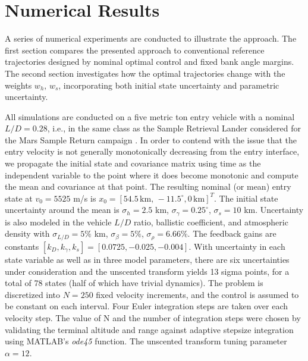 \documentclass[journal ]{new-aiaa}
\begin{document}
\section*{Numerical Results}
A series of numerical experiments are conducted to illustrate the approach. The first section compares the presented approach to conventional reference trajectories designed by nominal optimal control and fixed bank angle margins. The second section investigates how the optimal trajectories change with the weights $w_h,\,w_s$, incorporating both initial state uncertainty and parametric uncertainty.

All simulations are conducted on a five metric ton entry vehicle with a nominal $L/D=0.28$, i.e., in the same class as the Sample Retrieval Lander considered for the Mars Sample Return campaign \cite{MSR}. In order to contend with the issue that the entry velocity is not generally monotonically decreasing from the entry interface, we propagate the initial state and covariance matrix using time as the independent variable to the point where it does become monotonic and compute the mean and covariance at that point. The resulting nominal (or mean) entry state at $v_0 = 5525$ m/s is $x_0 = [54.5\,\mathrm{km},\,-11.5^{\circ}, 0\,\mathrm{km}]^T$. The initial state uncertainty around the mean is $\sigma_h = 2.5$ km, $\sigma_{\gamma} = 0.25^{\circ}$, $\sigma_s = 10$ km. Uncertainty is also modeled in the vehicle $L/D$ ratio, ballistic coefficient, and atmospheric density with $\sigma_{L/D} = 5\%$ km, $\sigma_{\beta} = 5\%$, $\sigma_{\rho} = 6.66\%$. The feedback gains are constants $[k_D, k_{\gamma}, k_s] = [0.0725, -0.025, -0.004]$. With uncertainty in each state variable as well as in three model parameters, there are six uncertainties under consideration and the unscented transform yields 13 sigma points, for a total of 78 states (half of which have trivial dynamics). The problem is discretized into $N=250$ fixed velocity increments, and the control is assumed to be constant on each interval. Four Euler integration steps are taken over each velocity step. The value of N and the number of integration steps were chosen by validating the terminal altitude and range against adaptive stepsize integration using MATLAB's \textit{ode45} function. The unscented transform tuning parameter $\alpha=12$. 
\end{document}
